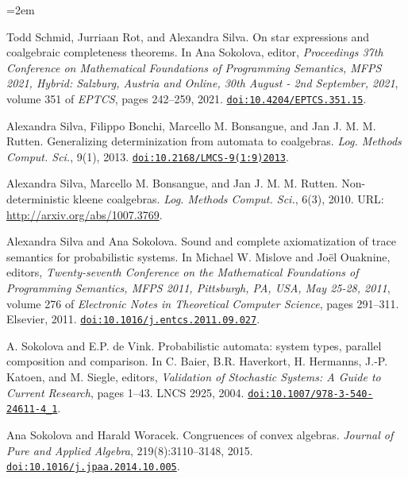 \documentclass[11pt,a4paper]{amsart}
\begin{document}
\begin{list}{}{\leftmargin=2em}
\hypertarget{html:bib.bib22}{}
\item[]  [22]  Todd Schmid, Jurriaan Rot, and Alexandra Silva.  On star expressions and coalgebraic completeness theorems.  In Ana Sokolova, editor, \emph{Proceedings 37th Conference on Mathematical Foundations of Programming Semantics, MFPS 2021, Hybrid: Salzburg, Austria and Online, 30th August - 2nd September, 2021}, volume 351 of \emph{EPTCS}, pages 242–259, 2021.  \href{https://doi.org/10.4204/EPTCS.351.15}{\nolinkurl{doi:10.4204/EPTCS.351.15}}.  
\hypertarget{html:bib.bib23}{}
\item[]  [23]  Alexandra Silva, Filippo Bonchi, Marcello M. Bonsangue, and Jan J. M. M. Rutten.  Generalizing determinization from automata to coalgebras.  \emph{Log. Methods Comput. Sci.}, 9(1), 2013.  \href{https://doi.org/10.2168/LMCS-9(1:9)2013}{\nolinkurl{doi:10.2168/LMCS-9(1:9)2013}}.  
\hypertarget{html:bib.bib24}{}
\item[]  [24]  Alexandra Silva, Marcello M. Bonsangue, and Jan J. M. M. Rutten.  Non-deterministic kleene coalgebras.  \emph{Log. Methods Comput. Sci.}, 6(3), 2010.  URL: \href{http://arxiv.org/abs/1007.3769}{http://arxiv.org/abs/1007.3769}.  
\hypertarget{html:bib.bib25}{}
\item[]  [25]  Alexandra Silva and Ana Sokolova.  Sound and complete axiomatization of trace semantics for probabilistic systems.  In Michael W. Mislove and Joël Ouaknine, editors, \emph{Twenty-seventh Conference on the Mathematical Foundations of Programming Semantics, MFPS 2011, Pittsburgh, PA, USA, May 25-28, 2011}, volume 276 of \emph{Electronic Notes in Theoretical Computer Science}, pages 291–311. Elsevier, 2011.  \href{https://doi.org/10.1016/j.entcs.2011.09.027}{\nolinkurl{doi:10.1016/j.entcs.2011.09.027}}.  
\hypertarget{html:bib.bib26}{}
\item[]  [26]  A. Sokolova and E.P. de Vink.  Probabilistic automata: system types, parallel composition and comparison.  In C. Baier, B.R. Haverkort, H. Hermanns, J.-P. Katoen, and M. Siegle, editors, \emph{Validation of Stochastic Systems: A Guide to Current Research}, pages 1–43. LNCS 2925, 2004.  \href{https://doi.org/10.1007/978-3-540-24611-4_1}{\nolinkurl{doi:10.1007/978-3-540-24611-4_1}}.  
\hypertarget{html:bib.bib27}{}
\item[]  [27]  Ana Sokolova and Harald Woracek.  Congruences of convex algebras.  \emph{Journal of Pure and Applied Algebra}, 219(8):3110–3148, 2015.  \href{https://doi.org/10.1016/j.jpaa.2014.10.005}{\nolinkurl{doi:10.1016/j.jpaa.2014.10.005}}.  

\end{list}
\end{document}
